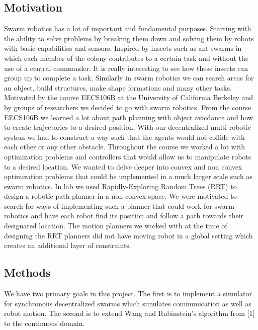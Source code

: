 \subsection{Motivation} 

Swarm robotics has a lot of important and fundamental purposes. Starting with the ability to solve problems by breaking them down and solving them by robots with basic capabilities and sensors. Inspired by insects such as ant swarms in which each member of the colony contributes to a certain task and without the use of a central commander. It is really interesting to see how these insects can group up to complete a task. Similarly in swarm robotics we can search areas for an object, build structures, make shape formations and many other tasks. Motivated by the course EECS106B at the University of California Berkeley and by groups of researchers we decided to go with swarm robotics. From the course EECS106B we learned a lot about path planning with object avoidance and how to create trajectories to a desired position. With our decentralized multi-robotic system we had to construct a way such that the agents would not collide with each other or any other obstacle. Throughout the course we worked a lot with optimization problems and controllers that would allow us to manipulate robots to a desired location. We wanted to delve deeper into convex and non convex optimization problems that could be implemented in a much larger scale such as swarm robotics. In lab we used Rapidly-Exploring Random Trees (RRT) to design a robotic path planner in a non-convex space. We were motivated to search for ways of implementing such a planner that could work for swarm robotics and have each robot find its position and follow a path towards their designated location. The motion planners we worked with at the time of designing the RRT planners did not have moving robot in a global setting which creates an additional layer of constraints. 










\subsection{Methods}

We have two primary goals in this project. The first is to implement a simulator for synchronous decentralized swarms which simulates communication as well as robot motion. The second is to extend Wang and Rubinstein's algorithm from [1] to the continuous domain.


